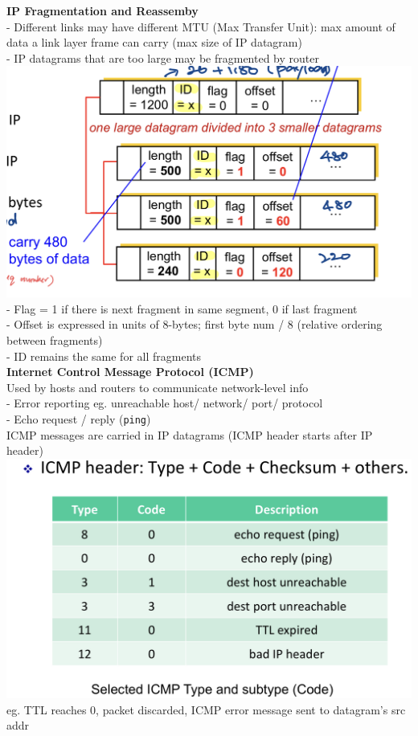 \documentclass[10pt, a4paper]{article}
\newcommand{\blue}[1]{{\color{MidnightBlue}#1}}
\newcommand{\red}[1]{{\color{red}#1}}
\begin{document}
\begin{multicols*}{3}
		\textbf{IP Fragmentation and Reassemby}\\
		- Different links may have different \blue{MTU} (Max Transfer Unit): max amount of data a link layer frame can carry (max size of IP datagram)\\
		- IP datagrams that are too large may be fragmented by router\\
		\includegraphics[scale=.15]{./assets/ipFragmentation}\\
		- Flag = 1 if there is next fragment in same segment, 0 if last fragment\\
		- Offset is expressed in units of \red{8-bytes}; first byte num / 8 (relative ordering between fragments)\\
		- ID remains the same for all fragments\\

		\textbf{Internet Control Message Protocol (ICMP)}\\
		Used by hosts and routers to communicate network-level info\\
		- Error reporting eg. unreachable host/ network/ port/ protocol\\
		- Echo request / reply (\texttt{ping})\\
		ICMP messages are carried in IP datagrams (ICMP header starts after IP header)\\
		\includegraphics[scale=.14]{./assets/icmp}\\
		eg. TTL reaches 0, packet discarded, ICMP error message sent to datagram's src addr\\










		

		
		
	\end{multicols*}
\end{document}

